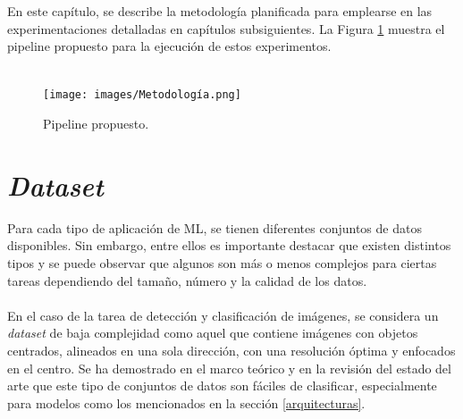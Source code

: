 En este capítulo, se describe la metodología planificada para emplearse en 
las experimentaciones detalladas en capítulos subsiguientes. La Figura \ref{pipeline} 
muestra el pipeline propuesto para la ejecución de estos experimentos.  \\\\

\begin{figure}[h!]
\texttt{[image: images/Metodología.png]}
\centering
\caption{Pipeline propuesto.  }
\label{pipeline}
\end{figure}

\section{\textit{Dataset}}

Para cada tipo de aplicación de ML, se tienen diferentes conjuntos de datos 
disponibles. Sin embargo, entre ellos es importante destacar que existen 
distintos tipos y se puede observar que algunos son más o menos 
complejos para ciertas tareas dependiendo del tamaño, número y la 
calidad de los datos.
\\\\
En el caso de la tarea de detección y clasificación de imágenes, 
se considera un \textit{dataset} de baja complejidad como aquel 
que contiene imágenes con objetos centrados, alineados en una sola 
dirección, con una resolución óptima y enfocados en el centro. Se ha 
demostrado en el marco teórico y en la revisión del estado del arte que 
este tipo de conjuntos de datos son fáciles de clasificar, 
especialmente para modelos como los mencionados en la sección \ref{arquitecturas}.
\\\\

